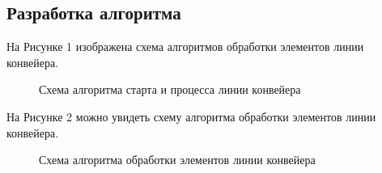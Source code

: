 \documentclass[14pt, a4paper]{extarticle}
\begin{document}
	\subsection{Разработка алгоритма}
	На Рисунке 1 изображена схема алгоритмов обработки элементов линии конвейера.
	\begin{figure}[h!]
		\caption{Схема алгоритма старта и процесса линии конвейера}
	\end{figure}
	\clearpage
	
	На Рисунке 2 можно увидеть схему алгоритма обработки элементов линии конвейера.
	\begin{figure}[h!]
		\caption{Схема алгоритма обработки элементов линии конвейера}
	\end{figure}
	\clearpage
	
\end{document}
